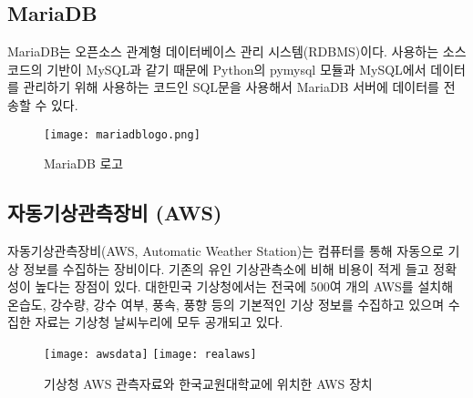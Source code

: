 \subsection{MariaDB}
MariaDB는 오픈소스 관계형 데이터베이스 관리 시스템(RDBMS)이다. 사용하는 소스 코드의 기반이 MySQL과 같기 때문에 Python의 pymysql 모듈과 MySQL에서 데이터를 관리하기 위해 사용하는 코드인 SQL문을 사용해서 MariaDB 서버에 데이터를 전송할 수 있다.

\begin{figure}[htbp]
	\centering
	\texttt{[image: mariadblogo.png]}
	\caption{MariaDB 로고}
	\label{MariaDB}
\end{figure}

\subsection{자동기상관측장비 (AWS)}
자동기상관측장비(AWS, Automatic Weather Station)는 컴퓨터를 통해 자동으로 기상 정보를 수집하는 장비이다. 기존의 유인 기상관측소에 비해 비용이 적게 들고 정확성이 높다는 장점이 있다. 대한민국 기상청에서는 전국에 500여 개의 AWS를 설치해 온습도, 강수량, 강수 여부, 풍속, 풍향 등의 기본적인 기상 정보를 수집하고 있으며 수집한 자료는 기상청 날씨누리에 모두 공개되고 있다. \cite{Ref4}

\begin{figure}[htbp]
	\centering
	\texttt{[image: awsdata]}
	\texttt{[image: realaws]}
	\caption{기상청 AWS 관측자료와 한국교원대학교에 위치한 AWS 장치}
	\label{AWS}
\end{figure}